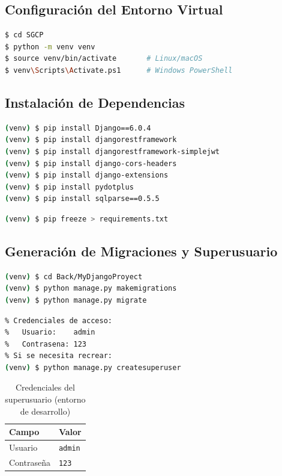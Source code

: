 \documentclass[12pt,a4paper]{article}
\begin{document}
\subsection{Configuración del Entorno Virtual}

\begin{lstlisting}[language=bash, caption=Configuración del entorno virtual]
$ cd SGCP
$ python -m venv venv
$ source venv/bin/activate       # Linux/macOS
$ venv\Scripts\Activate.ps1      # Windows PowerShell
\end{lstlisting}

\subsection{Instalación de Dependencias}

\begin{lstlisting}[language=bash, caption=Instalación de dependencias]
(venv) $ pip install Django==6.0.4
(venv) $ pip install djangorestframework
(venv) $ pip install djangorestframework-simplejwt
(venv) $ pip install django-cors-headers
(venv) $ pip install django-extensions
(venv) $ pip install pydotplus
(venv) $ pip install sqlparse==0.5.5
\end{lstlisting}

\begin{lstlisting}[language=bash, caption=Generación de requirements.txt]
(venv) $ pip freeze > requirements.txt
\end{lstlisting}

\subsection{Generación de Migraciones y Superusuario}

\begin{lstlisting}[language=bash, caption=Generando y aplicando migraciones]
(venv) $ cd Back/MyDjangoProyect
(venv) $ python manage.py makemigrations
(venv) $ python manage.py migrate
\end{lstlisting}

\begin{lstlisting}[language=bash, caption=Creación del superusuario]
% El superusuario ya esta incluido en db.sqlite3 del repositorio.
% Credenciales de acceso:
%   Usuario:    admin
%   Contrasena: 123
% Si se necesita recrear:
(venv) $ python manage.py createsuperuser
\end{lstlisting}

\begin{table}[h]
\centering
\begin{tabular}{|l|l|}
\hline
\textbf{Campo} & \textbf{Valor} \\
\hline
Usuario & \texttt{admin} \\
Contrase\~na & \texttt{123} \\
\hline
\end{tabular}
\caption{Credenciales del superusuario (entorno de desarrollo)}
\end{table}
\end{document}
